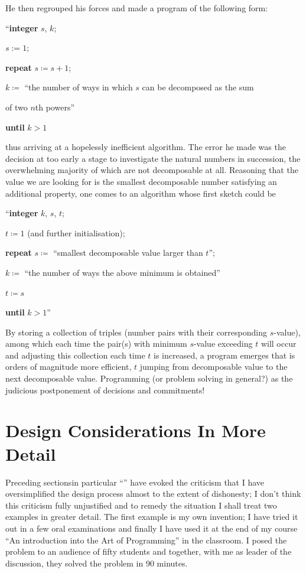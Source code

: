 He then regrouped his forces and made a program of the following form:

\quad \hspace{-.4em}``\textbf{integer} $s$, $k$;

\quad $s:= 1$;

\quad \textbf{repeat} $s\coloneq s + 1$;

\quad \quad $k\coloneq$ ``the number of ways in which $s$ can be decomposed as the sum

\quad \quad\quad of two $n$th powers''

\quad \textbf{until} $k > 1$

\noindent
thus arriving at a hopelessly inefficient algorithm. The error he made was the decision at too early a stage to investigate the natural numbers in succession, the overwhelming majority of which are not decomposable at all. Reasoning that the value we are looking for is the smallest decomposable number satisfying an additional property, one comes to an algorithm whose first sketch could be

\quad \hspace{-.4em}``\textbf{integer} $k$, $s$, $t$;

\quad $t \coloneq 1$ (and further initialisation);

\quad \textbf{repeat} $s \coloneq$ ``smallest decomposable value larger than $t$'';

\quad \quad $k \coloneq$ ``the number of ways the above minimum is obtained''

\quad \quad $t \coloneq s$

\quad \textbf{until} $k > 1$''

By storing a collection of triples (number pairs with their corresponding $s$-value), among which each time the pair(s) with minimum $s$-value exceeding $t$ will occur and adjusting this collection each time $t$ is increased, a program emerges that is orders of magnitude more efficient, $t$ jumping from decomposable value to the next decomposable value. Programming (or problem solving in general?) as the judicious postponement of decisions and commitments!

\section[Design considerations in more detail]{Design Considerations In More Detail}

Preceding sections\textemdash{}in particular ``'' have evoked the criticism that I have oversimplified the design process almost to the extent of dishonesty; I don't think this criticism fully unjustified and to remedy the situation I shall treat two examples in greater detail. The first example is my own invention; I have tried it out in a few oral examinations and finally I have used it at the end of my course ``An introduction into the Art of Programming'' in the classroom. I posed the problem to an audience of fifty students and together, with me as leader of the discussion, they solved the problem in 90 minutes.

